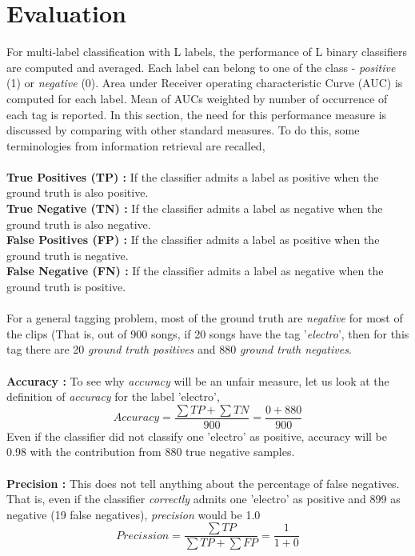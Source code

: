 \section{Evaluation}
\label{evaluation}
For multi-label classification with L labels, the performance of L binary classifiers are computed and averaged. Each label can belong to one of the class - \textit{positive} (1) or \textit{negative} (0). Area under Receiver operating characteristic Curve (AUC) is computed for each label. Mean of AUCs weighted by number of occurrence of each tag is reported. In this section, the need for this performance measure is discussed by comparing with other standard measures. To do this, some terminologies from information retrieval are recalled,\\
\\
\textbf{True Positives (TP) :} If the classifier admits a label as positive when the ground truth is also positive.\\
\textbf{True Negative (TN) :} If the classifier admits a label as negative when the ground truth is also negative.\\
\textbf{False Positives (FP) :} If the classifier admits a label as positive when the ground truth is negative.\\
\textbf{False Negative (FN) :} If the classifier admits a label as negative when the ground truth is positive.\\
\\
For a general tagging problem, most of the ground truth are \textit{negative} for most of the clips (That is, out of 900 songs, if 20 songs have the tag '\textit{electro}', then for this tag there are 20 \textit{ground truth positives} and 880 \textit{ground truth negatives}.\\
\\
\textbf{Accuracy :} To see why \textit{accuracy} will be an unfair measure, let us look at the definition of \textit{accuracy} for the label 'electro',
\[
  Accuracy = \frac{\sum TP + \sum TN}{900} = \frac{0+880}{900}
\]
Even if the classifier did not classify one 'electro' as positive, accuracy will be 0.98 with the contribution from 880 true negative samples.\\
\\
\textbf{Precision :} This does not tell anything about the percentage of false negatives. That is, even if the classifier \textit{correctly} admits one 'electro' as positive and 899 as negative (19 false negatives), \textit{precision} would be 1.0   
\[
  Precission = \frac{\sum TP}{\sum TP + \sum FP} = \frac{1}{1+0}
\]
